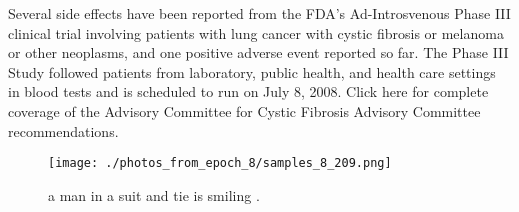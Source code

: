 \documentclass{article}%
\begin{document}
Several side effects have been reported from the FDA’s Ad{-}Introsvenous Phase III clinical trial involving patients with lung cancer with cystic fibrosis or melanoma or other neoplasms, and one positive adverse event reported so far. The Phase III Study followed patients from laboratory, public health, and health care settings in blood tests and is scheduled to run on July 8, 2008.\newline%
Click here for complete coverage of the Advisory Committee for Cystic Fibrosis Advisory Committee recommendations.\newline%

%


\begin{figure}[h!]%
\centering%
\texttt{[image: ./photos\_from\_epoch\_8/samples\_8\_209.png]}%
\caption{a man in a suit and tie is smiling .}%
\end{figure}

%
\end{document}
